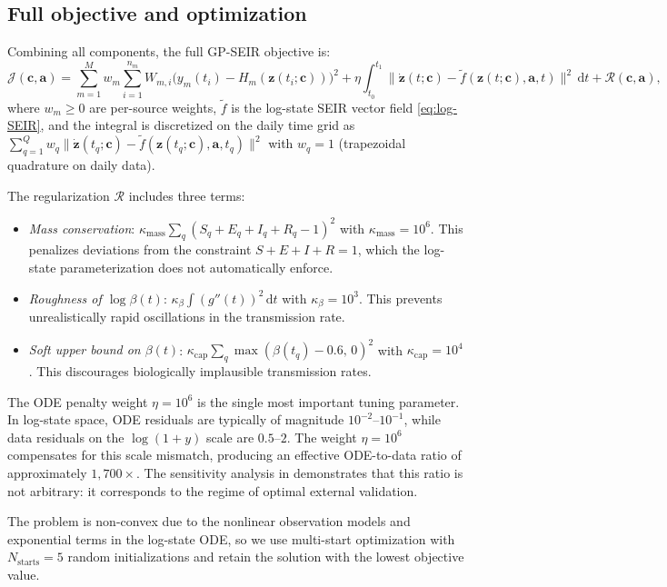 \documentclass[11pt]{article}
\newcommand{\bz}{\bm{z}}
\newcommand{\bc}{\bm{c}}
\newcommand{\ba}{\bm{a}}
\newcommand{\dd}{\,\mathrm{d}}
\begin{document}
\subsection{Full objective and optimization}\label{sec:gp-objective}

Combining all components, the full GP-SEIR objective is:
\begin{equation}\label{eq:objective}
  \mathcal{J}(\bc,\ba) = \sum_{m=1}^{M} w_m \sum_{i=1}^{n_m}
    W_{m,i}\bigl(y_m(t_i)-H_m(\bz(t_i;\bc))\bigr)^2
  + \eta\int_{t_0}^{t_1}\bigl\|\dot{\bz}(t;\bc)-\tilde{f}(\bz(t;\bc),\ba,t)\bigr\|^2\dd t
  + \mathcal{R}(\bc,\ba),
\end{equation}
where $w_m \geq 0$ are per-source weights, $\tilde{f}$ is the log-state SEIR vector field \eqref{eq:log-SEIR}, and the integral is discretized on the daily time grid as $\sum_{q=1}^{Q} w_q \|\dot{\bz}(t_q;\bc) - \tilde{f}(\bz(t_q;\bc),\ba,t_q)\|^2$ with $w_q = 1$ (trapezoidal quadrature on daily data).

The regularization $\mathcal{R}$ includes three terms:
\begin{itemize}
  \item \emph{Mass conservation}: $\kappa_{\mathrm{mass}} \sum_q (S_q + E_q + I_q + R_q - 1)^2$ with $\kappa_{\mathrm{mass}} = 10^6$. This penalizes deviations from the constraint $S+E+I+R=1$, which the log-state parameterization does not automatically enforce.
  \item \emph{Roughness of $\log\beta(t)$}: $\kappa_\beta \int (g''(t))^2 \dd t$ with $\kappa_\beta = 10^3$. This prevents unrealistically rapid oscillations in the transmission rate.
  \item \emph{Soft upper bound on $\beta(t)$}: $\kappa_{\mathrm{cap}} \sum_q \max(\beta(t_q) - 0.6,\, 0)^2$ with $\kappa_{\mathrm{cap}} = 10^4$. This discourages biologically implausible transmission rates.
\end{itemize}

The ODE penalty weight $\eta = 10^6$ is the single most important tuning parameter. In log-state space, ODE residuals are typically of magnitude $10^{-2}$--$10^{-1}$, while data residuals on the $\log(1+y)$ scale are $0.5$--$2$. The weight $\eta = 10^6$ compensates for this scale mismatch, producing an effective ODE-to-data ratio of approximately $1{,}700\times$. The sensitivity analysis in  demonstrates that this ratio is not arbitrary: it corresponds to the regime of optimal external validation.

The problem is non-convex due to the nonlinear observation models and exponential terms in the log-state ODE, so we use multi-start optimization with $N_{\mathrm{starts}}=5$ random initializations and retain the solution with the lowest objective value.
\end{document}
